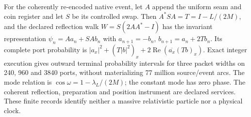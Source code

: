For the coherently re-encoded native event, let $A$ append the uniform
seam and coin register and let $S$ be its controlled swap.  Then
$A^*SA=T=I-L/(2M)$, and the declared reflection walk $W=S(2AA^*-I)$
has the invariant representation $\psi_n=Aa_n+SAb_n$ with
$a_{n+1}=-b_n$, $b_{n+1}=a_n+2Tb_n$.  Its complete port probability is
$|a_x|^2+(T|b|^2)_x+2\operatorname{Re}(\overline{a_x}(Tb)_x)$.
Exact integer execution gives outward terminal probability intervals for
three packet widths on 240, 960 and 3840 ports, without materializing
77 million source/event arcs.  The mode relation is
$\cos\omega=1-\lambda_L/(2M)$; the constant mode has zero phase.
The coherent reflection, preparation and position instrument are declared
services.  These finite records identify neither a massive relativistic
particle nor a physical clock.
